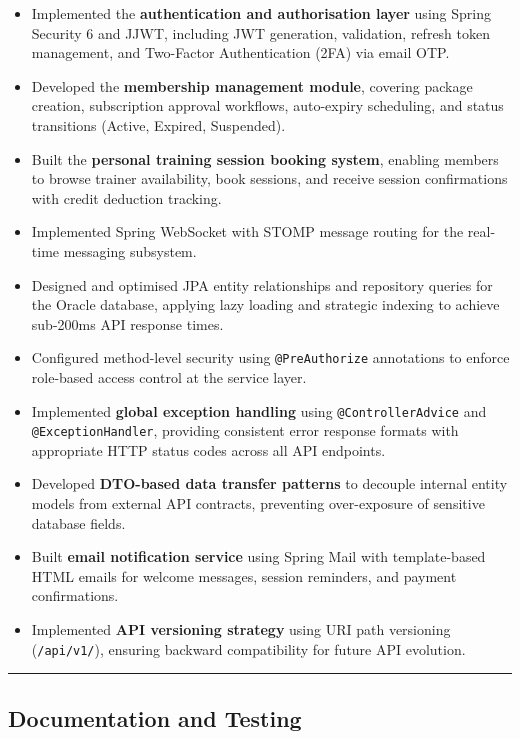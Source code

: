 \documentclass[
  12pt,
  a4paperpaper,
]{report}
\providecommand{\tightlist}{%
  \setlength{\itemsep}{0pt}\setlength{\parskip}{0pt}\setlength{\topsep}{2pt}\setlength{\partopsep}{0pt}}
\begin{document}
\begin{itemize}
\tightlist
\item
  Implemented the \textbf{authentication and authorisation layer} using
  Spring Security 6 and JJWT, including JWT generation, validation,
  refresh token management, and Two-Factor Authentication (2FA) via
  email OTP.
\item
  Developed the \textbf{membership management module}, covering package
  creation, subscription approval workflows, auto-expiry scheduling, and
  status transitions (Active, Expired, Suspended).
\item
  Built the \textbf{personal training session booking system}, enabling
  members to browse trainer availability, book sessions, and receive
  session confirmations with credit deduction tracking.
\item
  Implemented Spring WebSocket with STOMP message routing for the
  real-time messaging subsystem.
\item
  Designed and optimised JPA entity relationships and repository queries
  for the Oracle database, applying lazy loading and strategic indexing
  to achieve sub-200ms API response times.
\item
  Configured method-level security using \texttt{@PreAuthorize}
  annotations to enforce role-based access control at the service layer.
\item
  Implemented \textbf{global exception handling} using
  \texttt{@ControllerAdvice} and \texttt{@ExceptionHandler}, providing
  consistent error response formats with appropriate HTTP status codes
  across all API endpoints.
\item
  Developed \textbf{DTO-based data transfer patterns} to decouple
  internal entity models from external API contracts, preventing
  over-exposure of sensitive database fields.
\item
  Built \textbf{email notification service} using Spring Mail with
  template-based HTML emails for welcome messages, session reminders,
  and payment confirmations.
\item
  Implemented \textbf{API versioning strategy} using URI path
  versioning (\texttt{/api/v1/}), ensuring backward compatibility for
  future API evolution.
\end{itemize}

\smallskip\noindent

\rule{\textwidth}{0.3pt}

\subsection{Documentation and Testing}\label{documentation-and-testing}
\end{document}
